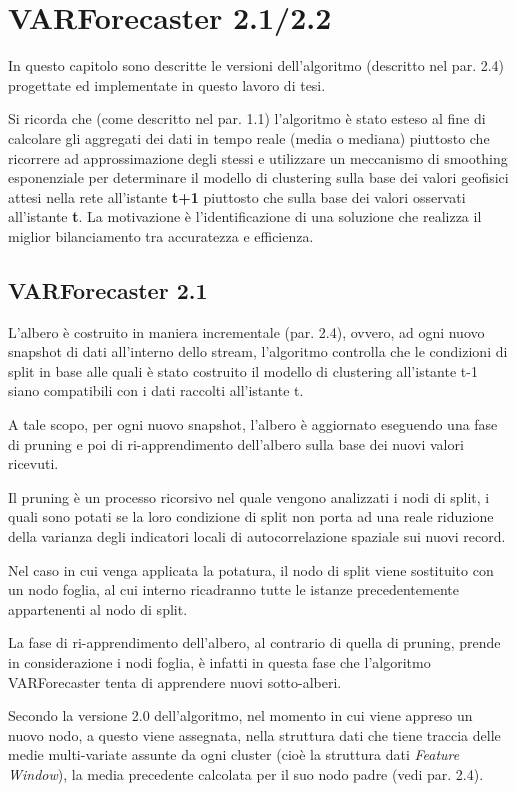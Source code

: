 \documentclass[12pt,a4paper,twoside,openright]{book}
\begin{document}
\chapter{VARForecaster 2.1/2.2}
In questo capitolo sono descritte le versioni dell'algoritmo (descritto nel par. 2.4) progettate ed implementate in questo lavoro di tesi. 

Si ricorda che (come descritto nel par. 1.1) l'algoritmo è stato esteso al fine di calcolare gli aggregati dei dati in tempo reale (media o mediana) piuttosto che ricorrere ad approssimazione degli stessi e utilizzare un meccanismo di smoothing esponenziale per determinare il modello di clustering sulla base dei valori geofisici attesi nella rete all'istante {\bfseries t+1} piuttosto che sulla base dei valori osservati all'istante {\bfseries t}. La motivazione è l'identificazione di una soluzione che realizza il miglior bilanciamento tra accuratezza e efficienza.
\section{VARForecaster 2.1}
L'albero è costruito in maniera incrementale (par. 2.4), ovvero, ad ogni nuovo snapshot di dati all'interno dello stream, l'algoritmo controlla che le condizioni di split in base alle quali è stato costruito il modello di clustering all'istante t-1 siano compatibili con i dati raccolti all'istante t.

A tale scopo, per ogni nuovo snapshot, l'albero è aggiornato eseguendo una fase di pruning e poi di ri-apprendimento dell'albero sulla base dei nuovi valori ricevuti. 

Il pruning è un processo ricorsivo nel quale vengono analizzati i nodi di split, i quali sono potati se la loro condizione di split non porta ad una reale riduzione della varianza degli indicatori locali di autocorrelazione spaziale sui nuovi record. 

Nel caso in cui venga applicata la potatura, il nodo di split viene sostituito con un nodo foglia, al cui interno ricadranno tutte le istanze precedentemente appartenenti al nodo di split. 

La fase di ri-apprendimento dell'albero, al contrario di quella di pruning, prende in considerazione i nodi foglia, è infatti in questa fase che l'algoritmo VARForecaster tenta di apprendere nuovi sotto-alberi.

Secondo la versione 2.0 dell'algoritmo, nel momento in cui viene appreso un nuovo nodo, a questo viene assegnata, nella struttura dati che tiene traccia delle medie multi-variate assunte da ogni cluster (cioè la struttura dati \textit{Feature Window}), la media precedente calcolata per il suo nodo padre (vedi par. 2.4). 
\end{document}
